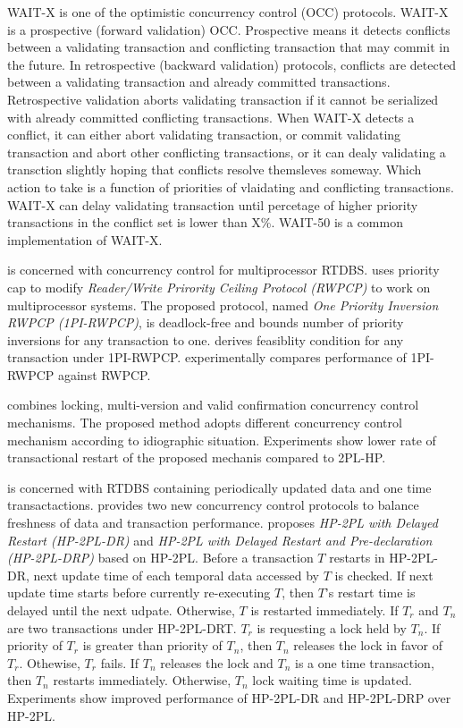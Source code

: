 \documentclass[12pt,english]{report}
\begin{document}
WAIT-X \cite{495222,859541} is one of the optimistic concurrency
control (OCC) protocols. WAIT-X is a prospective (forward validation)
OCC. Prospective means it detects conflicts between a validating transaction
and conflicting transaction that may commit in the future. In retrospective
(backward validation) protocols, conflicts are detected between a
validating transaction and already committed transactions. Retrospective
validation aborts validating transaction if it cannot be serialized
with already committed conflicting transactions. When WAIT-X detects
a conflict, it can either abort validating transaction, or commit
validating transaction and abort other conflicting transactions, or
it can dealy validating a transction slightly hoping that conflicts
resolve themsleves someway. Which action to take is a function of
priorities of vlaidating and conflicting transactions. WAIT-X can
delay validating transaction until percetage of higher priority transactions
in the conflict set is lower than X\%. WAIT-50 is a common implementation
of WAIT-X.

\cite{853992} is concerned with concurrency control for multiprocessor
RTDBS. \cite{853992} uses priority cap to modify \textit{Reader/Write
Prirority Ceiling Protocol (RWPCP)} \cite{83617} to work on multiprocessor
systems. The proposed protocol, named \textit{One Priority Inversion
RWPCP (1PI-RWPCP)}, is deadlock-free and bounds number of priority
inversions for any transaction to one. \cite{853992} derives feasiblity
condition for any transaction under 1PI-RWPCP. \cite{853992} experimentally
compares performance of 1PI-RWPCP against RWPCP.

\cite{5532682} combines locking, multi-version and valid confirmation
concurrency control mechanisms. The proposed method adopts different
concurrency control mechanism according to idiographic situation.
Experiments show lower rate of transactional restart of the proposed
mechanis compared to 2PL-HP.

\cite{1541104} is concerned with RTDBS containing periodically updated
data and one time transactactions. \cite{1541104} provides two new
concurrency control protocols to balance freshness of data and transaction
performance. \cite{1541104} proposes \textit{HP-2PL with Delayed
Restart (HP-2PL-DR)} and \textit{HP-2PL with Delayed Restart and Pre-declaration
(HP-2PL-DRP)} based on HP-2PL. Before a transaction $T$ restarts
in HP-2PL-DR, next update time of each temporal data accessed by $T$
is checked. If next update time starts before currently re-executing
$T$, then $T$'s restart time is delayed until the next udpate. Otherwise,
$T$ is restarted immediately. If $T_{r}$ and $T_{n}$ are two transactions
under HP-2PL-DRT. $T_{r}$ is requesting a lock held by $T_{n}$.
If priority of $T_{r}$ is greater than priority of $T_{n}$, then
$T_{n}$ releases the lock in favor of $T_{r}$. Othewise, $T_{r}$
fails. If $T_{n}$ releases the lock and $T_{n}$ is a one time transaction,
then $T_{n}$ restarts immediately. Otherwise, $T_{n}$ lock waiting
time is updated. Experiments show improved performance of HP-2PL-DR
and HP-2PL-DRP over HP-2PL.
\end{document}
